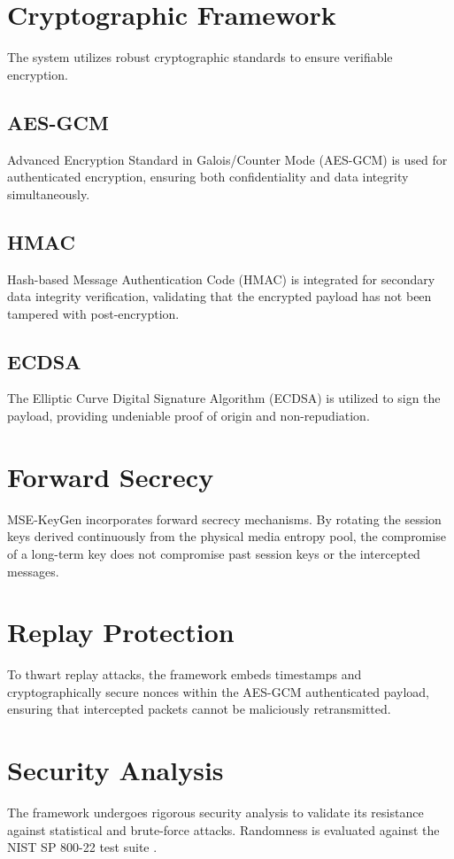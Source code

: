 \documentclass[conference]{IEEEtran}
\begin{document}
\section{Cryptographic Framework}
The system utilizes robust cryptographic standards to ensure verifiable encryption.
\subsection{AES-GCM}
Advanced Encryption Standard in Galois/Counter Mode (AES-GCM) is used for authenticated encryption, ensuring both confidentiality and data integrity simultaneously.

\subsection{HMAC}
Hash-based Message Authentication Code (HMAC) is integrated for secondary data integrity verification, validating that the encrypted payload has not been tampered with post-encryption.

\subsection{ECDSA}
The Elliptic Curve Digital Signature Algorithm (ECDSA) is utilized to sign the payload, providing undeniable proof of origin and non-repudiation.

\section{Forward Secrecy}
MSE-KeyGen incorporates forward secrecy mechanisms. By rotating the session keys derived continuously from the physical media entropy pool, the compromise of a long-term key does not compromise past session keys or the intercepted messages.

\section{Replay Protection}
To thwart replay attacks, the framework embeds timestamps and cryptographically secure nonces within the AES-GCM authenticated payload, ensuring that intercepted packets cannot be maliciously retransmitted.

\section{Security Analysis}
The framework undergoes rigorous security analysis to validate its resistance against statistical and brute-force attacks. Randomness is evaluated against the NIST SP 800-22 test suite \cite{nist80022}.
\end{document}
